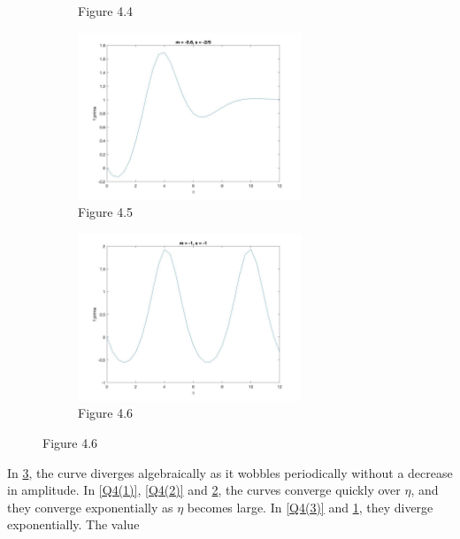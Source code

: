 \documentclass[a4paper,11pt]{article}
\begin{document}
\begin{figure}[H]
\begin{subfigure}{0.5\textwidth}
\caption{Figure 4.4}
\label{Q4(4)}
\end{subfigure}
\begin{subfigure}{0.5\textwidth}
\includegraphics[width = \linewidth, height = 5cm]{Q4(5).jpg}
\caption{Figure 4.5}
\label{Q4(5)}
\end{subfigure}
\begin{subfigure}{0.5\textwidth}
\includegraphics[width = \linewidth, height = 5cm]{Q4(6).jpg}
\caption{Figure 4.6}
\label{Q4(6)}
\end{subfigure}
\label{Q4}
\end{figure}
In \ref{Q4(6)}, the curve diverges algebraically as it wobbles periodically without a decrease in amplitude. In \ref{Q4(1)}, \ref{Q4(2)} and \ref{Q4(5)}, the curves converge quickly over $\eta$, and they converge exponentially as $\eta$ becomes large. In \ref{Q4(3)} and \ref{Q4(4)}, they diverge exponentially. 
The value 
\end{document}

